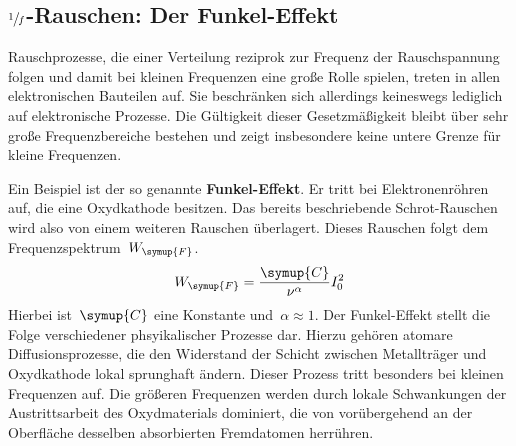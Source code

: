 \subsection{$\sfrac{1}{f}$-Rauschen: Der Funkel-Effekt}
%
Rauschprozesse, die einer Verteilung reziprok zur Frequenz der Rauschspannung
folgen und damit bei kleinen Frequenzen eine große Rolle spielen, treten in
allen elektronischen Bauteilen auf. Sie beschränken sich allerdings keineswegs
lediglich auf elektronische Prozesse. Die Gültigkeit dieser Gesetzmäßigkeit
bleibt über sehr große Frequenzbereiche bestehen und zeigt insbesondere keine
untere Grenze für kleine Frequenzen.

Ein Beispiel ist der so genannte \textbf{Funkel-Effekt}. Er tritt bei
Elektronenröhren auf, die eine Oxydkathode besitzen. Das bereits beschriebende
Schrot-Rauschen wird also von einem weiteren Rauschen überlagert. Dieses
Rauschen folgt dem Frequenzspektrum~$W_{\symup{F}}$.
%
\begin{equation}
  W_{\symup{F}}=\frac{\symup{C}}{\nu^{\alpha}}I_0^2
\end{equation}
%
Hierbei ist~$\symup{C}$ eine Konstante und~$\alpha\approx1$. Der Funkel-Effekt
stellt die Folge verschiedener phsyikalischer Prozesse dar. Hierzu gehören
atomare Diffusionsprozesse, die den Widerstand der Schicht zwischen Metallträger
und Oxydkathode lokal sprunghaft ändern. Dieser Prozess tritt besonders bei
kleinen Frequenzen auf. Die größeren Frequenzen werden durch lokale Schwankungen
der Austrittsarbeit des Oxydmaterials dominiert, die von vorübergehend an der
Oberfläche desselben absorbierten Fremdatomen herrühren.
